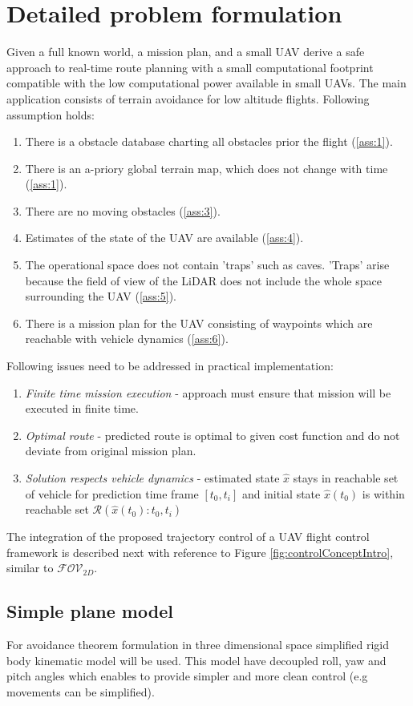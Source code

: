 \chapter {Detailed problem formulation}\label{ch:problemFormulation3D}
\noindent
Given a full known world, a mission plan, and a small UAV derive a safe approach to real-time route planning with a small computational footprint compatible with the low computational power available in small UAVs. The main application consists of terrain avoidance for low altitude flights. Following assumption holds:
\begin{enumerate}
  \item There is a obstacle database charting all obstacles prior the flight (\ref{ass:1}).
  \item There is an a-priory global terrain map, which does not change with time (\ref{ass:1}).
  \item There are no moving obstacles (\ref{ass:3}).
  \item Estimates of the state of the UAV are available (\ref{ass:4}).
  \item The operational space does not contain 'traps' such as caves. 'Traps' arise because the field of view of the LiDAR does not include the whole space surrounding the UAV (\ref{ass:5}).
  \item There is a mission plan for the UAV consisting of waypoints which are reachable with vehicle dynamics (\ref{ass:6}).
\end{enumerate}
\noindent
Following issues need to be addressed in practical implementation:
\begin{enumerate}
    \item \textit{Finite time mission execution} - approach must ensure that mission will be executed in finite time.
    \item \textit{Optimal route} - predicted route is optimal to given cost function and do not deviate from original mission plan.
    \item \textit{Solution respects vehicle dynamics} - estimated state $\hat{x}$ stays in reachable set of vehicle for prediction time frame $[t_0,t_i]$ and initial state $\hat{x}(t_0)$ is within reachable set $\mathscr{R}(\hat{x}(t_0):t_0,t_i)$
\end{enumerate}
\noindent
The integration of the proposed trajectory control of a UAV flight control framework is described next with reference to Figure \ref{fig:controlConceptIntro}, similar to $\mathscr{FOV}_{2D}$.

\section{Simple plane model}\label{sec:3DsimplisticplaneModel}
\noindent For avoidance theorem formulation in three dimensional space simplified rigid body kinematic model will be used. This model have decoupled roll, yaw and pitch angles which enables to provide simpler and more clean control (e.g movements can be simplified). 

